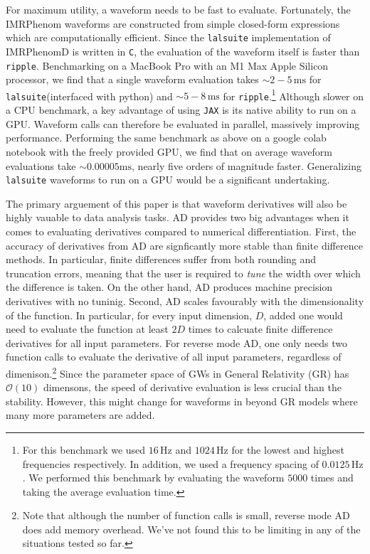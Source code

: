 \documentclass[twocolumn]{aastex631}
\newcommand{\jax}{\texttt{JAX}\xspace}
\newcommand{\ripple}{\texttt{ripple}\xspace}
\newcommand{\lalsuite}{\texttt{lalsuite}\xspace}
\begin{document}
For maximum utility, a waveform needs to be fast to evaluate.
Fortunately, the IMRPhenom waveforms are constructed from simple closed-form expressions which are computationally efficient.
Since the \lalsuite implementation of IMRPhenomD is written in \texttt{C}, the evaluation of the waveform itself is faster than \ripple.
Benchmarking on a MacBook Pro with an M1 Max Apple Silicon processor, we find that a single waveform evaluation takes $\sim 2-5\,\mathrm{ms}$ for \lalsuite (interfaced with python) and $\sim 5-8\,\mathrm{ms}$ for \ripple.\footnote{
    For this benchmark we used $16\,\mathrm{Hz}$ and $1024\,\mathrm{Hz}$ for the lowest and highest frequencies respectively. 
    In addition, we used a frequency spacing of $0.0125\,\mathrm{Hz}$. 
    We performed this benchmark by evaluating the waveform $5000$ times and taking the average evaluation time.
}
Although slower on a CPU benchmark, a key advantage of using \jax is its native ability to run on a GPU.
Waveform calls can therefore be evaluated in parallel, massively improving performance.
Performing the same benchmark as above on a google colab notebook with the freely provided GPU, we find that on average waveform evaluations take $\sim 0.00005\mathrm{ms}$, nearly five orders of magnitude faster.
Generalizing \lalsuite waveforms to run on a GPU would be a significant undertaking.

The primary arguement of this paper is that waveform derivatives will also be highly vauable to data analysis tasks. 
AD provides two big advantages when it comes to evaluating derivatives compared to numerical differentiation.
First, the accuracy of derivatives from AD are signficantly more stable than finite difference methods.
In particular, finite differences suffer from both rounding and truncation errors, meaning that the user is required to \textit{tune} the width over which the difference is taken.
On the other hand, AD produces machine precision derivatives with no tuninig.
Second, AD scales favourably with the dimensionality of the function.
In particular, for every input dimension, $D$, added one would need to evaluate the function at least $2D$ times to calcuate finite difference derivatives for all input parameters.
For reverse mode AD, one only needs two function calls to evaluate the derivative of all input parameters, regardless of dimenison.\footnote{
    Note that although the number of function calls is small, reverse mode AD does add memory overhead.
    We've not found this to be limiting in any of the situations tested so far.
}
Since the parameter space of GWs in General Relativity (GR) has $\mathcal{O}(10)$ dimensons, the speed of derivative evaluation is less crucial than the stability.
However, this might change for waveforms in beyond GR models where many more parameters are added.
\end{document}
